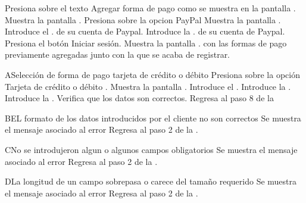 	
	\begin{UCtrayectoria}
		\UCpaso[\UCactor] Presiona sobre el texto Agregar forma de pago como se muestra en la pantalla . 
		\UCpaso Muestra la pantalla . 
		\UCpaso[\UCactor] Presiona sobre la opcion PayPal
		\UCpaso Muestra la pantalla  . 
		\UCpaso[\UCactor]Introduce el . de su cuenta de Paypal.
		\UCpaso[\UCactor]Introduce la . de su cuenta de Paypal.
		\UCpaso[\UCactor]Presiona el botón Iniciar sesión.
		\UCpaso Muestra la pantalla . con las formas de pago previamente agregadas junto con la que se acaba de registrar.
	\end{UCtrayectoria}
	

	\begin{UCtrayectoriaA}{A}{Selección de forma de pago tarjeta de crédito o débito}
		\UCpaso[\UCactor]Presiona sobre la opción Tarjeta de crédito o débito .
		\UCpaso Muestra la pantalla  .
		 \UCpaso[\UCactor]Introduce el .
		 \UCpaso[\UCactor]Introduce la .
		 \UCpaso[\UCactor]Introduce la .
		\UCpaso Verifica que los datos son correctos. 
		\UCpaso Regresa al paso 8 de la 
	\end{UCtrayectoriaA}

	\begin{UCtrayectoriaA}{B}{EL formato de los datos introducidos por el cliente no son correctos}
		\UCpaso Se muestra el mensaje asociado al error 
		\UCpaso Regresa al paso 2 de la .
	\end{UCtrayectoriaA}
	
\begin{UCtrayectoriaA}{C}{No se introdujeron algun o algunos campos obligatorios}
		\UCpaso Se muestra el mensaje asociado al error 
		\UCpaso Regresa al paso 2 de la .
	\end{UCtrayectoriaA}

\begin{UCtrayectoriaA}{D}{La longitud de un campo sobrepasa o carece del tamaño requerido}
		\UCpaso Se muestra el mensaje asociado al error 
		\UCpaso Regresa al paso 2 de la .
	\end{UCtrayectoriaA}


	